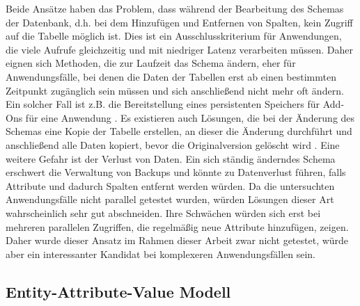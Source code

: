 Beide Ansätze haben das Problem, dass während der Bearbeitung des Schemas der Datenbank, d.h. bei dem Hinzufügen und Entfernen von Spalten, kein Zugriff auf die Tabelle möglich ist. Dies ist ein Ausschlusskriterium für Anwendungen, die viele Aufrufe gleichzeitig und mit niedriger Latenz verarbeiten müssen. Daher eignen sich Methoden, die zur Laufzeit das Schema ändern, eher für Anwendungsfälle, bei denen die Daten der Tabellen erst ab einen bestimmten Zeitpunkt zugänglich sein müssen und sich anschließend nicht mehr oft ändern. Ein solcher Fall ist z.B. die Bereitstellung eines persistenten Speichers für Add-Ons für eine Anwendung \cite{.12.07.2021}. Es existieren auch Lösungen, die bei der Änderung des Schemas eine Kopie der Tabelle erstellen, an dieser die Änderung durchführt und anschließend alle Daten kopiert, bevor die Originalversion gelöscht wird \cite{GitHub.12.07.2021}.
Eine weitere Gefahr ist der Verlust von Daten. Ein sich ständig änderndes Schema erschwert die Verwaltung von Backups und könnte zu Datenverlust führen, falls Attribute und dadurch Spalten entfernt werden würden. Da die untersuchten Anwendungsfälle nicht parallel getestet wurden, würden Lösungen dieser Art wahrscheinlich sehr gut abschneiden. Ihre Schwächen würden sich erst bei mehreren parallelen Zugriffen, die regelmäßig neue Attribute hinzufügen, zeigen. Daher wurde dieser Ansatz im Rahmen dieser Arbeit zwar nicht getestet, würde aber ein interessanter Kandidat bei komplexeren Anwendungsfällen sein.








\subsection{Entity-Attribute-Value Modell}

